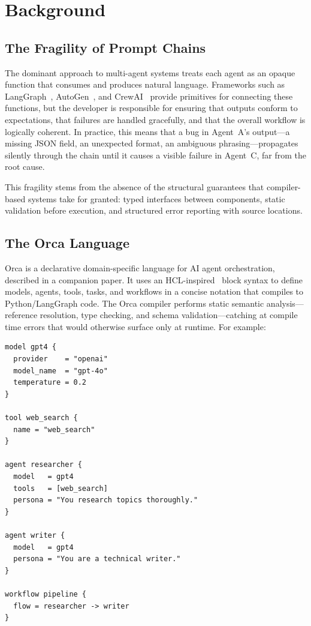 \documentclass[sigconf,nonacm]{acmart}
\begin{document}
\section{Background}
\label{sec:background}

\subsection{The Fragility of Prompt Chains}
\label{sec:background:fragility}

The dominant approach to multi-agent systems treats each agent as an
opaque function that consumes and produces natural language. Frameworks
such as LangGraph~\cite{langgraph}, AutoGen~\cite{autogen}, and
CrewAI~\cite{crewai} provide primitives for connecting these functions,
but the developer is responsible for ensuring that outputs conform to
expectations, that failures are handled gracefully, and that the overall
workflow is logically coherent. In practice, this means that a bug in
Agent~A's output---a missing JSON field, an unexpected format, an
ambiguous phrasing---propagates silently through the chain until it
causes a visible failure in Agent~C, far from the root cause.

This fragility stems from the absence of the structural guarantees that
compiler-based systems take for granted: typed interfaces between
components, static validation before execution, and structured error
reporting with source locations.

\subsection{The Orca Language}
\label{sec:background:orca}

Orca is a declarative domain-specific language for AI agent
orchestration, described in a companion paper. It uses an
HCL-inspired~\cite{terraform} block syntax to define models, agents,
tools, tasks, and workflows in a concise notation that compiles to
Python/LangGraph code. The Orca compiler performs static semantic
analysis---reference resolution, type checking, and schema
validation---catching at compile time errors that would otherwise
surface only at runtime. For example:

\begin{lstlisting}[caption={An Orca program defining a two-agent
  research pipeline.},label={fig:orca-example}]
model gpt4 {
  provider    = "openai"
  model_name  = "gpt-4o"
  temperature = 0.2
}

tool web_search {
  name = "web_search"
}

agent researcher {
  model   = gpt4
  tools   = [web_search]
  persona = "You research topics thoroughly."
}

agent writer {
  model   = gpt4
  persona = "You are a technical writer."
}

workflow pipeline {
  flow = researcher -> writer
}
\end{lstlisting}
\end{document}
